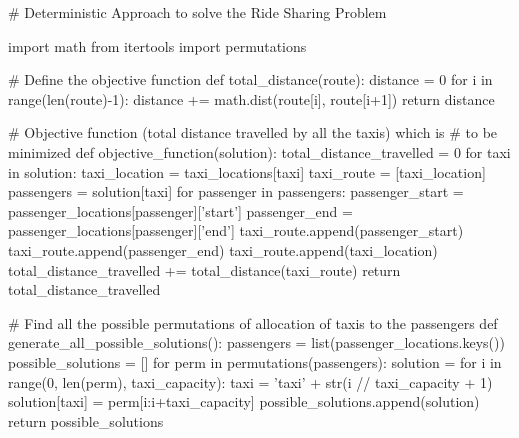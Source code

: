 \documentclass{article}
\begin{document}
\begin{pythoncode}
# Deterministic Approach to solve the Ride Sharing Problem

import math
from itertools import permutations

# Define the objective function
def total_distance(route):
  distance = 0
  for i in range(len(route)-1):
    distance += math.dist(route[i], route[i+1])
  return distance

# Objective function (total distance travelled by all the taxis) which is 
# to be minimized
def objective_function(solution):
  total_distance_travelled = 0
  for taxi in solution:
    taxi_location = taxi_locations[taxi]
    taxi_route = [taxi_location]
    passengers = solution[taxi]
    for passenger in passengers:
      passenger_start = passenger_locations[passenger]['start']
      passenger_end = passenger_locations[passenger]['end']
      taxi_route.append(passenger_start)
      taxi_route.append(passenger_end)
    taxi_route.append(taxi_location)
    total_distance_travelled += total_distance(taxi_route)
  return total_distance_travelled

# Find all the possible permutations of allocation of taxis to the passengers
def generate_all_possible_solutions():
  passengers = list(passenger_locations.keys())
  possible_solutions = []
  for perm in permutations(passengers):
    solution = {}
    for i in range(0, len(perm), taxi_capacity):
      taxi = 'taxi' + str(i // taxi_capacity + 1)
      solution[taxi] = perm[i:i+taxi_capacity]
    possible_solutions.append(solution)
  return possible_solutions

\end{pythoncode}

\newpage
\end{document}
